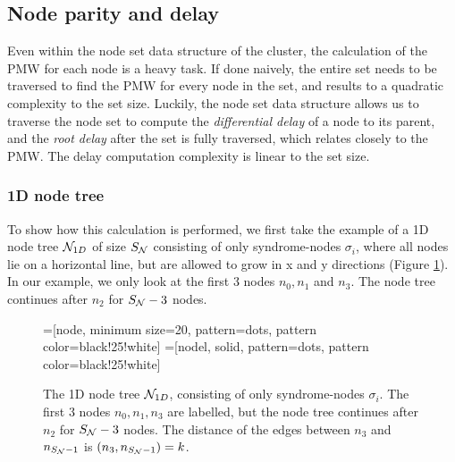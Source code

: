 \subsection{Node parity and delay}\label{sec:nodedelay}

Even within the node set data structure of the cluster, the calculation of the PMW for each node is a heavy task. If done naively, the entire set needs to be traversed to find the PMW for every node in the set, and results to a quadratic complexity to the set size. Luckily, the node set data structure allows us to traverse the node set to compute the \emph{differential delay} of a node to its parent, and the \emph{root delay} after the set is fully traversed, which relates closely to the PMW. The delay computation complexity is linear to the set size.

\subsubsection{1D node tree}
To show how this calculation is performed, we first take the example of a 1D node tree $\mathcal{N}_{1D}$ of size $S_{\mathcal{N}}$ consisting of only syndrome-nodes $\sigma_i$, where all nodes lie on a horizontal line, but are allowed to grow in x and y directions (Figure \ref{fig:1dnodetree}). In our example, we only look at the first 3 nodes $n_0, n_1$ and $n_3$. The node tree continues after $n_2$ for $S_{\mathcal{N}} - 3$ nodes.

\begin{figure}
  \centering
  =[node, minimum size=20, pattern=dots, pattern color=black!25!white]
  =[nodel, solid, pattern=dots, pattern color=black!25!white]
  \caption{The 1D node tree $\mathcal{N}_{1D}$, consisting of only syndrome-nodes $\sigma_i$. The first 3 nodes $n_0, n_1, n_3$ are labelled, but the node tree continues after $n_2$ for $S_{\mathcal{N}} - 3$ nodes. The distance of the edges between $n_3$ and $n_{S_{\mathcal{N}}-1}$ is $(n_3, n_{S_{\mathcal{N}}-1})=k$.}\label{fig:1dnodetree}
\end{figure}

